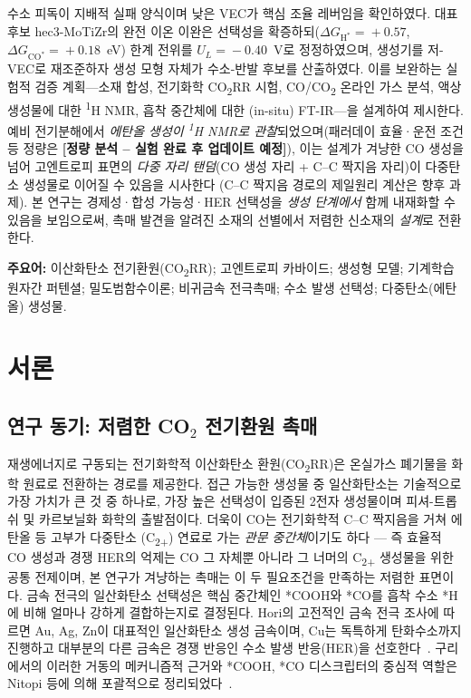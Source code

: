 \documentclass[11pt,a4paper]{report}
\newcommand{\tbu}[1]{\textcolor{red!70!black}{\textbf{[#1 -- 실험 완료 후 업데이트 예정]}}}
\newcommand{\dGCO}{\Delta G_{\mathrm{CO^*}}}
\newcommand{\dGH}{\Delta G_{\mathrm{H^*}}}
\begin{document}
수소 피독이 지배적 실패 양식이며 낮은 VEC가 핵심 조율 레버임을 확인하였다. 대표 후보
hec3-MoTiZr의 완전 이온 이완은 선택성을 확증하되($\dGH\!=\!+0.57$, $\dGCO\!=\!+0.18$~eV) 한계
전위를 $U_L\!=\!-0.40$~V로 정정하였으며, 생성기를 저-VEC로 재조준하자 생성 모형 자체가
수소-반발 후보를 산출하였다. 이를 보완하는 실험적 검증 계획---소재 합성, 전기화학
CO\textsubscript{2}RR 시험, CO/CO\textsubscript{2} 온라인 가스 분석, 액상 생성물에 대한
\textsuperscript{1}H NMR, 흡착 중간체에 대한 (in-situ) FT-IR---을 설계하여 제시한다. 예비
전기분해에서 \emph{에탄올 생성이 \textsuperscript{1}H NMR로 관찰}되었으며(패러데이 효율·운전
조건 등 정량은 \tbu{정량 분석}), 이는 설계가 겨냥한 CO 생성을 넘어 고엔트로피 표면의 \emph{다중
자리 탠덤}(CO 생성 자리 + C--C 짝지음 자리)이 다중탄소 생성물로 이어질 수 있음을 시사한다
(C--C 짝지음 경로의 제일원리 계산은 향후 과제). 본 연구는 경제성·합성 가능성·HER 선택성을
\emph{생성 단계에서} 함께 내재화할 수 있음을 보임으로써, 촉매 발견을 알려진 소재의 선별에서
저렴한 신소재의 \emph{설계}로 전환한다.
\par\vspace{6pt}
\noindent\textbf{주요어:} 이산화탄소 전기환원(CO\textsubscript{2}RR); 고엔트로피 카바이드; 생성형
모델; 기계학습 원자간 퍼텐셜; 밀도범함수이론; 비귀금속 전극촉매; 수소 발생 선택성; 다중탄소(에탄올)
생성물.

\tableofcontents

\chapter{서론}
\label{ch:intro}

\section{연구 동기: 저렴한 CO\texorpdfstring{$_2$}{2} 전기환원 촉매}
재생에너지로 구동되는 전기화학적 이산화탄소 환원(CO\textsubscript{2}RR)은 온실가스 폐기물을
화학 원료로 전환하는 경로를 제공한다. 접근 가능한 생성물 중 일산화탄소는 기술적으로 가장
가치가 큰 것 중 하나로, 가장 높은 선택성이 입증된 2전자 생성물이며 피셔-트롭쉬 및 카르보닐화
화학의 출발점이다. 더욱이 CO는 전기화학적 C--C 짝지음을 거쳐 에탄올 등 고부가 다중탄소
(C\textsubscript{2+}) 연료로 가는 \emph{관문 중간체}이기도 하다 --- 즉 효율적 CO 생성과 경쟁
HER의 억제는 CO 그 자체뿐 아니라 그 너머의 C\textsubscript{2+} 생성물을 위한 공통 전제이며,
본 연구가 겨냥하는 촉매는 이 두 필요조건을 만족하는 저렴한 표면이다. 금속 전극의 일산화탄소 선택성은 핵심 중간체인 \mbox{*COOH}와 *CO를 흡착
수소 *H에 비해 얼마나 강하게 결합하는지로 결정된다. Hori의 고전적인 금속 전극 조사에 따르면
Au, Ag, Zn이 대표적인 일산화탄소 생성 금속이며, Cu는 독특하게 탄화수소까지 진행하고 대부분의
다른 금속은 경쟁 반응인 수소 발생 반응(HER)을 선호한다~\cite{hori2008}. 구리에서의 이러한
거동의 메커니즘적 근거와 *COOH, *CO 디스크립터의 중심적 역할은 Nitopi 등에 의해 포괄적으로
정리되었다~\cite{nitopi2019}.
\end{document}
